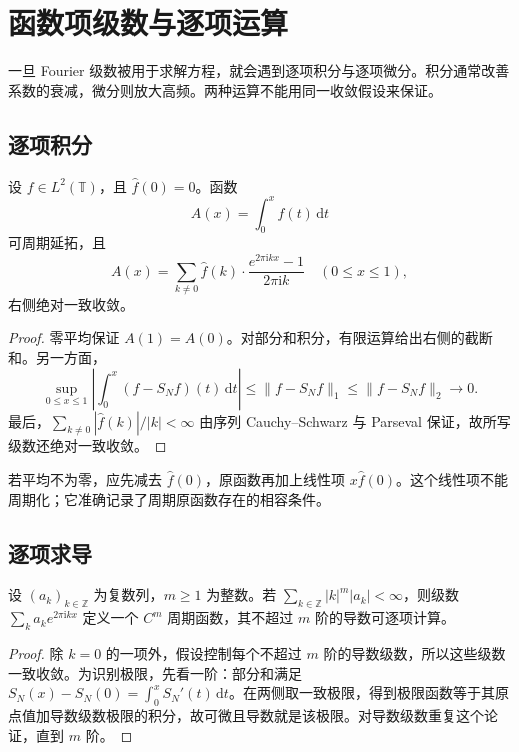 \section{函数项级数与逐项运算}
\label{b2:sec:0206}

一旦 Fourier 级数被用于求解方程，就会遇到逐项积分与逐项微分。积分通常改善系数的衰减，微分则放大高频。两种运算不能用同一收敛假设来保证。

\subsection{逐项积分}
\label{b2:subsec:020601}

\begin{proposition}\label{b2:prop:02-integrated-series}
设 \(f\in L^2(\mathbb T)\)，且 \(\widehat f(0)=0\)。函数
\[
 A(x)=\int_0^x f(t)\,\mathrm{d}t
\]
可周期延拓，且
\[
 A(x)=\sum_{k\ne0}\widehat f(k)\cdot\dfrac{e^{2\pi\mathrm{i}kx}-1}{2\pi\mathrm{i}k}
 \quad(0\leq x\leq1),
\]
右侧绝对一致收敛。
\end{proposition}
\begin{proof}
零平均保证 \(A(1)=A(0)\)。对部分和积分，有限运算给出右侧的截断和。另一方面，
\[
 \sup_{0\leq x\leq1}\left|\int_0^x(f-S_Nf)(t)\,\mathrm{d}t\right|
 \leq\|f-S_Nf\|_1\leq\|f-S_Nf\|_2\longrightarrow0.
\]
最后，\(\sum_{k\ne0}|\widehat f(k)|/|k|<\infty\) 由序列 Cauchy--Schwarz 与 Parseval 保证，故所写级数还绝对一致收敛。
\end{proof}

若平均不为零，应先减去 \(\widehat f(0)\)，原函数再加上线性项 \(x\widehat f(0)\)。这个线性项不能周期化；它准确记录了周期原函数存在的相容条件。

\subsection{逐项求导}
\label{b2:subsec:020602}

\begin{proposition}\label{b2:prop:02-termwise-differentiation}
设 \((a_k)_{k\in\mathbb Z}\) 为复数列，\(m\geq1\) 为整数。若 \(\sum_{k\in\mathbb Z}|k|^m|a_k|<\infty\)，则级数 \(\sum_ka_ke^{2\pi\mathrm{i}kx}\) 定义一个 \(C^m\) 周期函数，其不超过 \(m\) 阶的导数可逐项计算。
\end{proposition}
\begin{proof}
除 \(k=0\) 的一项外，假设控制每个不超过 \(m\) 阶的导数级数，所以这些级数一致收敛。为识别极限，先看一阶：部分和满足 \(S_N(x)-S_N(0)=\int_0^xS_N'(t)\,\mathrm{d}t\)。在两侧取一致极限，得到极限函数等于其原点值加导数级数极限的积分，故可微且导数就是该极限。对导数级数重复这个论证，直到 \(m\) 阶。
\end{proof}

